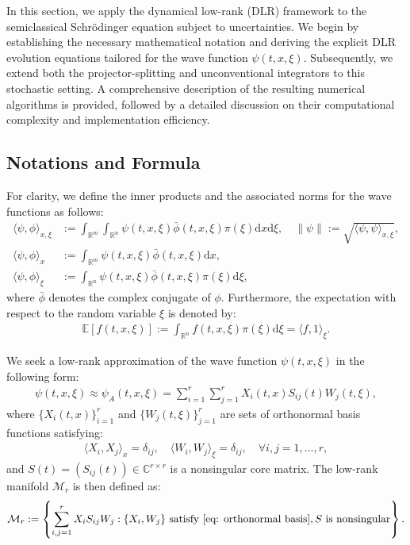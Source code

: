 \documentclass[preprint,11pt]{elsarticle}
\begin{document}
In this section, we apply the dynamical low-rank (DLR) framework to the semiclassical Schrödinger equation subject to uncertainties. We begin by establishing the necessary mathematical notation and deriving the explicit DLR evolution equations tailored for the wave function $\psi(t, x, \xi)$. Subsequently, we extend both the projector-splitting and unconventional integrators to this stochastic setting. A comprehensive description of the resulting numerical algorithms is provided, followed by a detailed discussion on their computational complexity and implementation efficiency.

\subsection{Notations and Formula}

For clarity, we define the inner products and the associated norms for the wave functions as follows:
\begin{align*}
    \langle \psi, \phi \rangle_{x,\xi} &:= \int_{\mathbb{R}^m} \int_{\mathbb{R}^n} \psi(t,x,\xi) \bar{\phi}(t,x,\xi) \pi(\xi) \mathrm{d}x\mathrm{d}\xi, \quad \|\psi\| := \sqrt{\langle \psi, \psi \rangle_{x,\xi}}, \\
    \langle \psi, \phi \rangle_{x} &:= \int_{\mathbb{R}^m} \psi(t,x,\xi) \bar{\phi}(t,x,\xi) \mathrm{d}x, \\
    \langle \psi, \phi \rangle_{\xi} &:= \int_{\mathbb{R}^n} \psi(t,x,\xi) \bar{\phi}(t,x,\xi) \pi(\xi) \mathrm{d}\xi,
\end{align*}
where $\bar{\phi}$ denotes the complex conjugate of $\phi$. Furthermore, the expectation with respect to the random variable $\xi$ is denoted by:
\begin{align*}
    \mathbb{E}[f(t,x,\xi)] := \int_{\mathbb{R}^n} f(t,x,\xi) \pi(\xi) \mathrm{d}\xi = \langle f, 1 \rangle_{\xi}.
\end{align*}

We seek a low-rank approximation of the wave function $\psi(t,x,\xi)$ in the following form:
\begin{align*}
    \psi(t,x,\xi) \approx \psi_A(t,x,\xi) = \sum_{i=1}^{r} \sum_{j=1}^{r} X_i(t,x) S_{ij}(t) W_j(t,\xi),
\end{align*}
where $\{X_i(t,x)\}_{i=1}^r$ and $\{W_j(t,\xi)\}_{j=1}^r$ are sets of orthonormal basis functions satisfying:
\begin{align}\label{eq: orthonormal basis}
    \langle X_i, X_j \rangle_{x} = \delta_{ij}, \quad \langle W_i, W_j \rangle_{\xi} = \delta_{ij}, \quad \forall i,j = 1, \dots, r,
\end{align}
and $S(t) = (S_{ij}(t)) \in \mathbb{C}^{r \times r}$ is a nonsingular core matrix. The low-rank manifold $\mathcal{M}_r$ is then defined as:
\begin{equation}
    \mathcal{M}_r := \left\{ \sum_{i,j=1}^{r} X_i S_{ij} W_j : \{X_i, W_j\} \text{ satisfy \eqref{eq: orthonormal basis}}, S \text{ is nonsingular} \right\}.
\end{equation}
\end{document}
